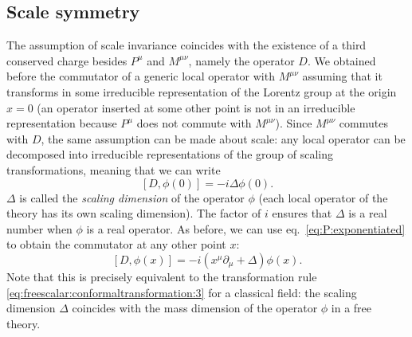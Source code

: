 \documentclass[a4paper,12pt]{article}
\numberwithin{equation}{section}
\begin{document}
\subsection{Scale symmetry}

The assumption of scale invariance coincides with the existence of a third conserved charge besides $P^\mu$ and $M^{\mu\nu}$, namely the operator $D$.
We obtained before the commutator of a generic local operator with $M^{\mu\nu}$ assuming that it transforms in some irreducible representation of the Lorentz group at the origin $x = 0$
(an operator inserted at some other point is not in an irreducible representation because $P^\mu$ does not commute with $M^{\mu\nu}$).
Since $M^{\mu\nu}$ commutes with $D$, the same assumption can be made about scale: any local operator can be decomposed into irreducible representations of the group of scaling transformations, meaning that we can write
\begin{equation}
	\left[ D, \phi(0) \right] = -i \Delta \phi(0).
\end{equation}
$\Delta$ is called the \emph{scaling dimension} of the operator $\phi$ (each local operator of the theory has its own scaling dimension).
The factor of $i$ ensures that $\Delta$ is a real number when $\phi$ is a real operator.
As before, we can use eq.~\eqref{eq:P:exponentiated} to obtain the commutator at any other point $x$:
\begin{equation}
	\left[ D, \phi(x) \right]
	= -i \left( x^\mu \partial_\mu + \Delta \right) \phi(x).
	\label{eq:commutator:D}
\end{equation}
Note that this is precisely equivalent to the transformation rule \eqref{eq:freescalar:conformaltransformation:3} for a classical field:
the scaling dimension $\Delta$ coincides with the mass dimension of the operator $\phi$ in a free theory.
\end{document}
